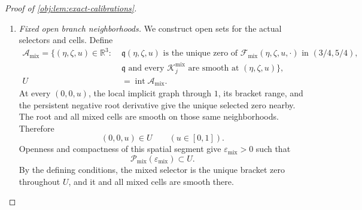 \begin{proof}[Proof of \cref{obj:lem:exact-calibrations}]
\begin{enumerate}
For each \(m\ge0\), compactness gives positive bounds
\[
\|\mathrm D^m\mathfrak p\|\le B_{\mathrm p,m},
\qquad
\|\mathrm D^m\mathcal K^{\mathrm{fair}}_j\|
\le C^{\mathrm{fair}}_{j,m}
\quad\hbox{on }\mathcal P_{\mathrm{fair}}(\varepsilon_0).
\]
Set
\[
\begin{aligned}
B_{\mathrm{fair},m}
&=B_{\mathrm p,m}
  +\sum_{j\in\mathcal I_{\mathrm{aux}}}C^{\mathrm{fair}}_{j,m},\\
B_{\mathrm{rem},m}
&=\max\{B_{\mathrm{cell},m},B_{\mathrm{fair},m}\},\\
B_m&=\max\{B_{\mathrm q,m},B_{\mathrm{rem},m}\}>0.
\end{aligned}
\]
Restriction to the smaller mixed region
\(\mathcal P_{\mathrm{mix}}(\varepsilon_0)\) preserves its earlier bounds. Thus
\[
\begin{array}{ll}
\|\mathrm D^m\mathfrak q\|\le B_m,\quad
\|\mathrm D^m\mathcal K^{\mathrm{mix}}_j\|\le B_m
&\text{on }\mathcal P_{\mathrm{mix}}(\varepsilon_0),\\[2mm]
\|\mathrm D^m\mathfrak p\|\le B_m,\quad
\|\mathrm D^m\mathcal K^{\mathrm{fair}}_j\|\le B_m
&\text{on }\mathcal P_{\mathrm{fair}}(\varepsilon_0).
\end{array}
\]
All these functions are \(C^\infty\) on their respective closed regions.

\item \emph{Fixed open branch neighborhoods.}
We construct open sets for the actual selectors and cells. Define
\[
\begin{aligned}
\mathcal A_{\mathrm{mix}}
=\bigl\{(\eta,\zeta,u)\in\mathbb R^3:\;&
\mathfrak q(\eta,\zeta,u)
\text{ is the unique zero of }
\mathcal F_{\mathrm{mix}}(\eta,\zeta,u,\cdot)
\text{ in }(3/4,5/4),\\[-1mm]
&\mathfrak q\text{ and every }\mathcal K^{\mathrm{mix}}_j
\text{ are smooth at }(\eta,\zeta,u)\bigr\},\\
U&=\operatorname{int}\mathcal A_{\mathrm{mix}}.
\end{aligned}
\]
At every \((0,0,u)\), the local implicit graph through \(1\), its bracket range, and the persistent negative root derivative give the unique selected zero nearby. The root and all mixed cells are smooth on those same neighborhoods. Therefore
\[
(0,0,u)\in U\qquad(u\in[0,1]).
\]
Openness and compactness of this spatial segment give
\(\varepsilon_{\mathrm{mix}}>0\) such that
\[
\mathcal P_{\mathrm{mix}}(\varepsilon_{\mathrm{mix}})\subset U.
\]
By the defining conditions, the mixed selector is the unique bracket zero throughout \(U\), and it and all mixed cells are smooth there.


\end{enumerate}
\end{proof}
